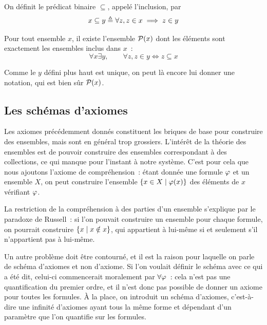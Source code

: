\begin{notation}
  On définit le prédicat binaire $\subseteq$, appelé l'inclusion, par
  \[x \subseteq y \triangleq \forall z, z \in x \implies z \in y\]
\end{notation}

\begin{axiom}\label{ax.ZF.pow}
  Pour tout ensemble $x$, il existe l'ensemble $\mathcal{P} (x)$ dont les éléments
  sont exactement les ensembles inclus dans $x$~:
  \[\forall x\exists y, \qquad \forall z, z \in y \iff z \subseteq x\]
\end{axiom}

\begin{notation}
  Comme le $y$ défini plus haut est unique, on peut là encore lui donner une
  notation, qui est bien sûr $\mathcal{P}(x)$.
\end{notation}

\subsection{Les schémas d'axiomes}

Les axiomes précédemment donnés constituent les briques de base pour construire
des ensembles, mais sont en général trop grossiers. L'intérêt de la théorie des
ensembles est de pouvoir construire des ensembles correspondant à des
collections, ce qui manque pour l'instant à notre système. C'est pour cela que
nous ajoutons l'axiome de compréhension~: étant donnée une formule $\varphi$ et
un ensemble $X$, on peut construire l'ensemble $\left\{ x \in X \;\middle\vert\; \varphi(x) \right\}$ des
éléments de $x$ vérifiant $\varphi$.

La restriction de la compréhension à des parties d'un ensemble s'explique par le
paradoxe de Russell~: si l'on pouvait construire un ensemble pour chaque
formule, on pourrait construire $\left\{ x \;\middle\vert\; x\notin x \right\}$, qui appartient à
lui-même si et seulement s'il n'appartient pas à lui-même.

Un autre problème doit être contourné, et il est la raison pour laquelle on
parle de schéma d'axiomes et non d'axiome. Si l'on voulait définir le schéma
avec ce qui a été dit, celui-ci commencerait moralement par $\forall \varphi$~:
cela n'est pas une quantification du premier ordre, et il n'est donc pas
possible de donner un axiome pour toutes les formules. \`A la place, on
introduit un schéma d'axiomes, c'est-à-dire une infinité d'axiomes ayant tous
la même forme et dépendant d'un paramètre que l'on quantifie sur les formules.

